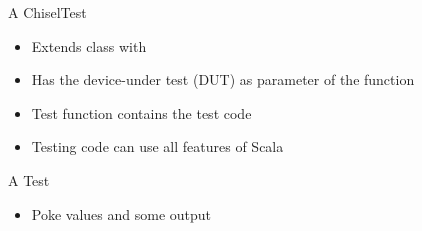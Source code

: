 \begin{frame}[fragile]{A ChiselTest}
\begin{itemize}
\item Extends class  with 
\item Has the device-under test (DUT) as parameter of the  function
\item Test function contains the test code
\item Testing code can use all features of Scala
\end{itemize}
\end{frame}



\begin{frame}[fragile]{A Test}
\begin{itemize}
\item Poke values and  some output
\end{itemize}
\end{frame}

%


